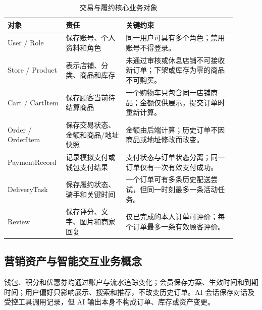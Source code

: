 \begin{longtable}{|L{0.19\linewidth}|L{0.25\linewidth}|L{0.46\linewidth}|}
\caption{交易与履约核心业务对象}\label{tab:domain-objects}\\ \hline
\textbf{对象} & \textbf{责任} & \textbf{关键约束} \\ \hline
User / Role & 保存账号、个人资料和角色 & 同一用户可具有多个角色；禁用账号不得登录。 \\ \hline
Store / Product & 表示店铺、分类、商品和库存 & 未通过审核或休息店铺不可接收新订单；下架或库存为零的商品不可购买。 \\ \hline
Cart / CartItem & 保存顾客当前待结算商品 & 一个购物车只包含同一店铺商品；金额仅供展示，提交订单时重新计算。 \\ \hline
Order / OrderItem & 保存交易状态、金额和商品/地址快照 & 金额由后端计算；历史订单不因商品或地址修改而改变。 \\ \hline
Payment\-Record & 记录模拟支付或钱包支付结果 & 支付状态与订单状态分离；同一订单仅有一次有效支付成功。 \\ \hline
DeliveryTask & 保存履约状态、骑手和关键时间 & 一个订单可有多条历史配送尝试，但同一时刻最多一条活动任务。 \\ \hline
Review & 保存评分、文字、图片和商家回复 & 仅已完成的本人订单可评价；每个订单最多一条有效顾客评价。 \\ \hline
\end{longtable}


\subsection{营销资产与智能交互业务概念}

钱包、积分和优惠券均通过账户与流水追踪变化；会员保存方案、生效时间和到期时间；用户偏好只影响展示、搜索和推荐，不改变历史订单。AI 会话保存对话及受控工具调用记录，但 AI 输出本身不构成订单、库存或资产变更。

